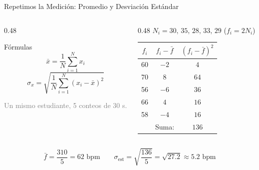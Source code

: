 \documentclass[aspectratio=169,xcolor=dvipsnames]{beamer}
\begin{document}
\begin{frame}{Repetimos la Medición: Promedio y Desviación Estándar}
	\begin{columns}[T]
		\begin{column}{0.48\textwidth}
			\begin{block}{Fórmulas}
				\[
					\bar{x} = \frac{1}{N}\sum_{i=1}^{N} x_i
				\]
				\[
					\sigma_x = \sqrt{\frac{1}{N}\sum_{i=1}^{N} (x_i - \bar{x})^2}
				\]
			\end{block}
			\small \textcolor{gray}{Un mismo estudiante, 5 conteos de 30 s.}
		\end{column}
		\begin{column}{0.48\textwidth}
			\small
			$N_i = 30,\,35,\,28,\,33,\,29$ \quad ($f_i = 2N_i$)
			\begin{center}
			\begin{tabular}{c|c|c}
				$f_i$ & $f_i-\bar f$ & $(f_i-\bar f)^2$ \\
				\hline
				60 & $-2$ & $4$ \\
				70 & $8$  & $64$ \\
				56 & $-6$ & $36$\\
				66 & $4$  & $16$\\
				58 & $-4$ & $16$\\
				\hline
				& Suma: & $136$
			\end{tabular}
			\end{center}
		\end{column}
	\end{columns}

	\vspace{0.25cm}
	\[
		\bar f = \frac{310}{5} = 62 \text{ bpm} \qquad
		\sigma_{\text{est}} = \sqrt{\frac{136}{5}} = \sqrt{27.2} \approx 5.2 \text{ bpm}
	\]
\end{frame}
\end{document}
